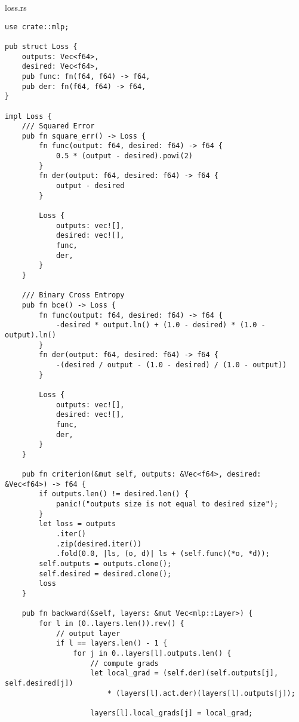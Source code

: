 \begin{code}
\caption{loss.rs}
\begin{verbatim}  
use crate::mlp;

pub struct Loss {
    outputs: Vec<f64>,
    desired: Vec<f64>,
    pub func: fn(f64, f64) -> f64,
    pub der: fn(f64, f64) -> f64,
}

impl Loss {
    /// Squared Error
    pub fn square_err() -> Loss {
        fn func(output: f64, desired: f64) -> f64 {
            0.5 * (output - desired).powi(2)
        }
        fn der(output: f64, desired: f64) -> f64 {
            output - desired
        }

        Loss {
            outputs: vec![],
            desired: vec![],
            func,
            der,
        }
    }

    /// Binary Cross Entropy
    pub fn bce() -> Loss {
        fn func(output: f64, desired: f64) -> f64 {
            -desired * output.ln() + (1.0 - desired) * (1.0 - output).ln()
        }
        fn der(output: f64, desired: f64) -> f64 {
            -(desired / output - (1.0 - desired) / (1.0 - output))
        }

        Loss {
            outputs: vec![],
            desired: vec![],
            func,
            der,
        }
    }

    pub fn criterion(&mut self, outputs: &Vec<f64>, desired: &Vec<f64>) -> f64 {
        if outputs.len() != desired.len() {
            panic!("outputs size is not equal to desired size");
        }
        let loss = outputs
            .iter()
            .zip(desired.iter())
            .fold(0.0, |ls, (o, d)| ls + (self.func)(*o, *d));
        self.outputs = outputs.clone();
        self.desired = desired.clone();
        loss
    }

    pub fn backward(&self, layers: &mut Vec<mlp::Layer>) {
        for l in (0..layers.len()).rev() {
            // output layer
            if l == layers.len() - 1 {
                for j in 0..layers[l].outputs.len() {
                    // compute grads
                    let local_grad = (self.der)(self.outputs[j], self.desired[j])
                        * (layers[l].act.der)(layers[l].outputs[j]);

                    layers[l].local_grads[j] = local_grad;


\end{verbatim}
\end{code}
